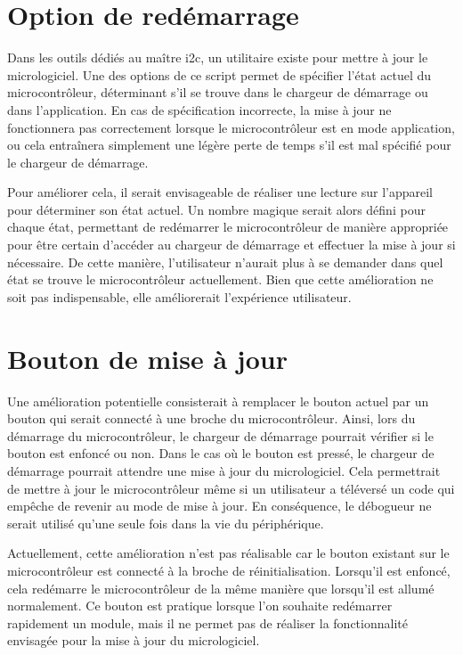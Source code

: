 \section{Option de redémarrage}

Dans les outils dédiés au maître \gls{i2c}, un utilitaire existe pour mettre à jour le micrologiciel.
Une des options de ce script permet de spécifier l'état actuel du microcontrôleur, déterminant s'il se trouve dans le chargeur de démarrage ou dans l'application.
En cas de spécification incorrecte, la mise à jour ne fonctionnera pas correctement lorsque le microcontrôleur est en mode application, ou cela entraînera simplement une légère perte de temps s'il est mal spécifié pour le chargeur de démarrage.

Pour améliorer cela, il serait envisageable de réaliser une lecture sur l'appareil pour déterminer son état actuel.
Un nombre magique serait alors défini pour chaque état, permettant de redémarrer le microcontrôleur de manière appropriée pour être certain d'accéder au chargeur de démarrage et effectuer la mise à jour si nécessaire.
De cette manière, l'utilisateur n'aurait plus à se demander dans quel état se trouve le microcontrôleur actuellement.
Bien que cette amélioration ne soit pas indispensable, elle améliorerait l'expérience utilisateur.

\section{Bouton de mise à jour}

Une amélioration potentielle consisterait à remplacer le bouton actuel par un bouton qui serait connecté à une broche du microcontrôleur. Ainsi, lors du démarrage du microcontrôleur, le chargeur de démarrage pourrait vérifier si le bouton est enfoncé ou non.
Dans le cas où le bouton est pressé, le chargeur de démarrage pourrait attendre une mise à jour du micrologiciel.
Cela permettrait de mettre à jour le microcontrôleur même si un utilisateur a téléversé un code qui empêche de revenir au mode de mise à jour.
En conséquence, le débogueur ne serait utilisé qu'une seule fois dans la vie du périphérique.

Actuellement, cette amélioration n'est pas réalisable car le bouton existant sur le microcontrôleur est connecté à la broche de réinitialisation.
Lorsqu'il est enfoncé, cela redémarre le microcontrôleur de la même manière que lorsqu'il est allumé normalement.
Ce bouton est pratique lorsque l'on souhaite redémarrer rapidement un module, mais il ne permet pas de réaliser la fonctionnalité envisagée pour la mise à jour du micrologiciel.

